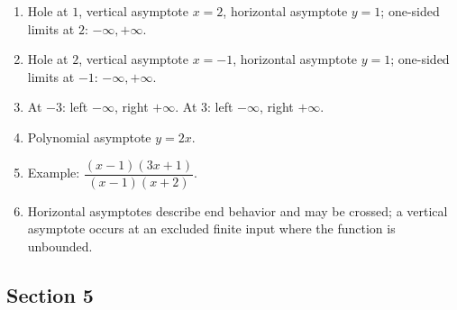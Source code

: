 \begin{enumerate}[label=\textbf{4.\arabic*}]
  \item Hole at \(1\), vertical asymptote \(x=2\), horizontal asymptote \(y=1\); one-sided limits at \(2\): \(-\infty,+\infty\).
  \item Hole at \(2\), vertical asymptote \(x=-1\), horizontal asymptote \(y=1\); one-sided limits at \(-1\): \(-\infty,+\infty\).
  \item At \(-3\): left \(-\infty\), right \(+\infty\). At \(3\): left \(-\infty\), right \(+\infty\).
  \item Polynomial asymptote \(y=2x\).
  \item Example: \(\dfrac{(x-1)(3x+1)}{(x-1)(x+2)}\).
  \item Horizontal asymptotes describe end behavior and may be crossed; a vertical asymptote occurs at an excluded finite input where the function is unbounded.
\end{enumerate}

\subsection*{Section 5}

